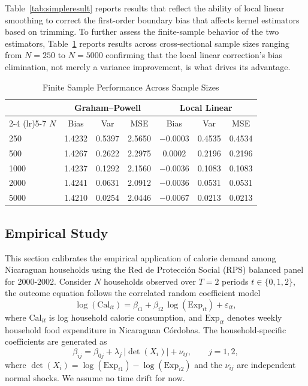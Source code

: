 \documentclass{article}
\begin{document}
Table~\ref{tab:simpleresult} reports results that reflect the ability of local linear smoothing to correct the first-order boundary bias that affects kernel estimators based on trimming. To further assess the finite-sample behavior of the two estimators, Table~\ref{tab:varyingN} reports results across cross-sectional sample sizes ranging from $N=250$ to $N=5000$ confirming that the local linear correction's bias elimination, not merely a variance improvement, is what drives its advantage.

\begin{table}[ht]
\centering
\caption{Finite Sample Performance Across Sample Sizes}
\label{tab:varyingN}
\begin{tabular}{lcccccc}
\hline\hline
& \multicolumn{3}{c}{Graham--Powell} & \multicolumn{3}{c}{Local Linear} \\
\cmidrule(lr){2-4} \cmidrule(lr){5-7}
$N$ & Bias & Var & MSE & Bias & Var & MSE \\
\hline
250   & 1.4232 & 0.5397 & 2.5650 & $-0.0003$ & 0.4535 & 0.4534 \\
500   & 1.4267 & 0.2622 & 2.2975 & \phantom{$-$}0.0002  & 0.2196 & 0.2196 \\
1000  & 1.4237 & 0.1292 & 2.1560 & $-0.0036$ & 0.1083 & 0.1083 \\
2000  & 1.4241 & 0.0631 & 2.0912 & $-0.0036$ & 0.0531 & 0.0531 \\
5000  & 1.4210 & 0.0254 & 2.0446 & $-0.0067$ & 0.0213 & 0.0213 \\
\hline\hline
\end{tabular}
\end{table}

\subsection{Empirical Study}

This section calibrates the empirical application of calorie demand among Nicaraguan households using the Red de Protección Social (RPS) balanced panel for 2000-2002. Consider $N$ households observed over $T=2$ periods $t\in\{0,1,2\}$, the outcome equation follows the correlated random coefficient model
\begin{equation}\label{eq:sim_dgp}
    \log(\text{Cal}_{it}) = \beta_{i1}
        + \beta_{i2}\,\log(\text{Exp}_{it})
        + \varepsilon_{it},
\end{equation}
where  $\text{Cal}_{it}$ is log household calorie consumption, and $\text{Exp}_{it}$ denotes weekly household food expenditure in
Nicaraguan Córdobas. The household-specific coefficients are generated as
\[\beta_{ij} = \beta_{0j}+ \lambda_j\,|\det(X_i)|+ \nu_{ij},\qquad j=1,2,\]
where $\det(X_i)=\log(\text{Exp}_{i1})-\log(\text{Exp}_{i2})$ and the $\nu_{ij}$ are independent normal shocks. We assume no time drift for now.
\end{document}
